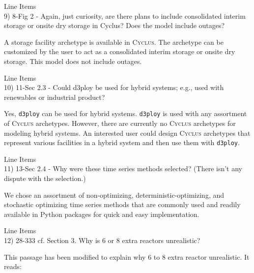 \documentclass[answers,11pt]{exam}
\newcommand{\Cyclus}{\textsc{Cyclus}\xspace}%
\newcommand{\deploy}{\texttt{d3ploy}\xspace}%
\begin{document}
\begin{questions}
\question Line Items \\
9) 8-Fig 2 - Again, just curiosity, are there plans to include consolidated interim storage or onsite dry
storage in Cyclus? Does the model include outages?

\begin{solution}
A storage facility archetype is available in \Cyclus. The archetype can be customized by the user to act as a 
consolidated interim storage or onsite dry storage. This model does not include outages. 
\end{solution}

\question Line Items \\
10) 11-Sec 2.3 - Could d3ploy be used for hybrid systems; e.g., used with renewables or industrial product?

\begin{solution}
Yes, \deploy can be used for hybrid systems. \deploy is used with any assortment of 
\Cyclus archetypes. However, there are currently no \Cyclus archetypes for modeling hybrid 
systems. An interested user could design \Cyclus archetypes that represent various facilities 
in a hybrid system and then use them with \deploy.
\end{solution}

\question Line Items \\
11) 13-Sec 2.4 - Why were these time series methods selected? (There isn’t any dispute with the selection.)

\begin{solution}
We chose an assortment of non-optimizing, deterministic-optimizing, and stochastic 
optimizing time series methods that are commonly used and readily available in Python 
packages for quick and easy implementation. 
\end{solution}

\question Line Items \\
12) 28-333 cf. Section 3. Why is 6 or 8 extra reactors unrealistic?

\begin{solution}
This passage has been modified to explain why 6 to 8 extra 
reactor unrealistic. It reads: 


\end{solution}
\end{questions}
\end{document}
